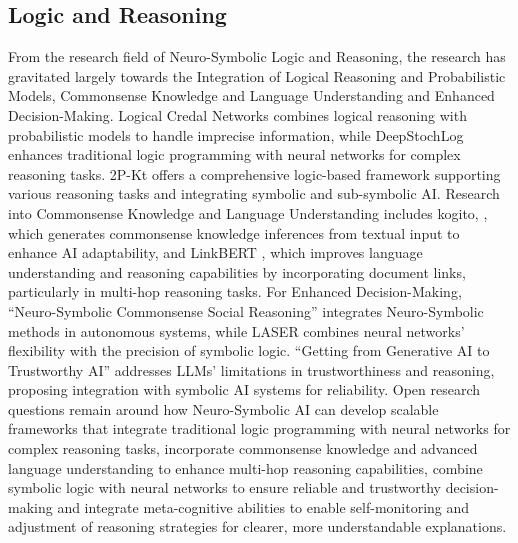 \documentclass[hf]{ceurart}
\begin{document}
\subsection{Logic and Reasoning}\label{subsec:disc_logic}
From the research field of Neuro-Symbolic Logic and Reasoning, the research has gravitated largely towards the Integration of Logical Reasoning and Probabilistic Models, Commonsense Knowledge and Language Understanding and Enhanced Decision-Making. Logical Credal Networks \cite{Qian2021} combines logical reasoning with probabilistic models to handle imprecise information, while DeepStochLog \cite{Winters2021} enhances traditional logic programming with neural networks for complex reasoning tasks. 2P-Kt \cite{Ciatto2021} offers a comprehensive logic-based framework supporting various reasoning tasks and integrating symbolic and sub-symbolic AI. Research into Commonsense Knowledge and Language Understanding includes kogito, \cite{Ismayilzada2022}, which generates commonsense knowledge inferences from textual input to enhance AI adaptability, and LinkBERT \cite{Yasunaga2022}, which improves language understanding and reasoning capabilities by incorporating document links, particularly in multi-hop reasoning tasks. For Enhanced Decision-Making, \enquote{Neuro-Symbolic Commonsense Social Reasoning} \cite{Chanin2023} integrates Neuro-Symbolic methods in autonomous systems, while LASER \cite{Huang2023} combines neural networks' flexibility with the precision of symbolic logic. \enquote{Getting from Generative AI to Trustworthy AI} \cite{Lenat2023} addresses LLMs' limitations in trustworthiness and reasoning, proposing integration with symbolic AI systems for reliability. Open research questions remain around how Neuro-Symbolic AI can develop scalable frameworks that integrate traditional logic programming with neural networks for complex reasoning tasks, incorporate commonsense knowledge and advanced language understanding to enhance multi-hop reasoning capabilities, combine symbolic logic with neural networks to ensure reliable and trustworthy decision-making and integrate meta-cognitive abilities to enable self-monitoring and adjustment of reasoning strategies for clearer, more understandable explanations.
\end{document}
